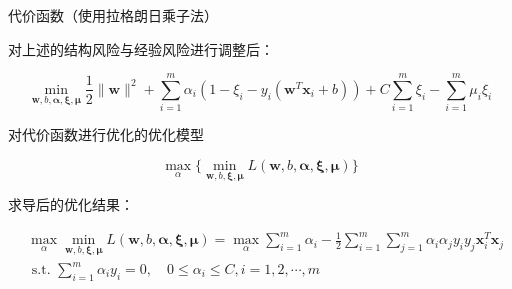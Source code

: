 \begin{outline}
	 \1 代价函数（使用拉格朗日乘子法）

	 对上述的结构风险与经验风险进行调整后：

	 \begin{equation}
		\min _{\boldsymbol{w}, b, \boldsymbol{\alpha}, \boldsymbol{\xi}, \boldsymbol{\mu}} \frac{1}{2}\|\boldsymbol{w}\|^{2}+\sum_{i=1}^{m} \alpha_{i}\left(1-\xi_{i}-y_{i}\left(\boldsymbol{w}^{T} \boldsymbol{x}_{i}+b\right)\right)+C \sum_{i=1}^{m} \xi_{i}-\sum_{i=1}^{m} \mu_{i} \xi_{i}
	 \end{equation}

	 \1 对代价函数进行优化的优化模型

	 \begin{equation}
		\max _{\alpha}\{ \min _{\mathbf{w}, b, \boldsymbol{\xi}, \boldsymbol{\mu}} L(\mathbf{w}, b, \boldsymbol{\alpha}, \boldsymbol{\xi}, \boldsymbol{\mu})\}
	\end{equation}

	求导后的优化结果：

	\begin{equation}
		\begin{aligned}
			&\max _{\alpha} \min _{\mathbf{w}, b, \boldsymbol{\xi}, \boldsymbol{\mu}} L(\mathbf{w}, b, \boldsymbol{\alpha}, \boldsymbol{\xi}, \boldsymbol{\mu})=\max _{\alpha} \sum_{i=1}^{m} \alpha_{i}-\frac{1}{2} \sum_{i=1}^{m} \sum_{j=1}^{m} \alpha_{i} \alpha_{j} y_{i} y_{j} \mathbf{x}_{i}^{T} \mathbf{x}_{j} \\
			&\text { s.t. } \sum_{i=1}^{m} \alpha_{i} y_{i}=0  ,\quad 0 \leqslant \alpha_{i} \leqslant C, i=1,2, \cdots, m
			\end{aligned}
	\end{equation}

\end{outline}

